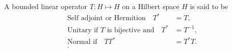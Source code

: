 \documentclass{article}
\theoremstyle{remark}
\begin{document}
\begin{definition}
  A bounded linear operator $T: H \mapsto H$ on a Hilbert space $H$ is said to be 
  \begin{align*}
    \text{Self adjoint or Hermition} \quad T^{*} &= T ,\\
    \text{Unitary if $T$ is bijective and} \quad T^{*} &= T^{-1} ,\\
    \text{Normal if} \quad TT^{*} &= T^{*}T. \\ 
  .\end{align*}
  
\end{definition}




\end{document}
